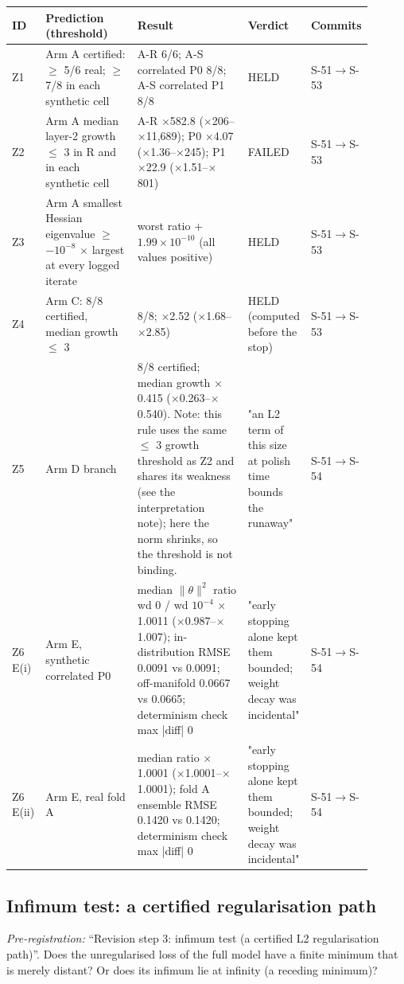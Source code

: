 {\footnotesize\setlength{\tabcolsep}{3pt}
\begin{longtable}{R{0.07\linewidth} R{0.28\linewidth} R{0.35\linewidth} R{0.09\linewidth} R{0.11\linewidth}}
\toprule
ID & Prediction (threshold) & Result & Verdict & Commits \\
\midrule
\endhead
Z1 & Arm A certified: $\geq$ 5/6 real; $\geq$ 7/8 in each synthetic cell & A-R 6/6; A-S correlated P0 8/8; A-S correlated P1 8/8 & HELD & S-51$\to$\allowbreak S-53 \\
Z2 & Arm A median layer-2 growth $\leq$ 3 in R and in each synthetic cell & A-R $\times$582.8 ($\times$206--$\times$11,689); P0 $\times$4.07 ($\times$1.36--$\times$245); P1 $\times$22.9 ($\times$1.51--$\times$801) & FAILED & S-51$\to$\allowbreak S-53 \\
Z3 & Arm A smallest Hessian eigenvalue $\geq$ $-10^{-8}$ $\times$ largest at every logged iterate & worst ratio +$1.99\times10^{-10}$ (all values positive) & HELD & S-51$\to$\allowbreak S-53 \\
Z4 & Arm C: 8/8 certified, median growth $\leq$ 3 & 8/8; $\times$2.52 ($\times$1.68--$\times$2.85) & HELD (computed before the stop) & S-51$\to$\allowbreak S-53 \\
Z5 & Arm D branch & 8/8 certified; median growth $\times$0.415 ($\times$0.263--$\times$0.540). Note: this rule uses the same $\leq$ 3 growth threshold as Z2 and shares its weakness (see the interpretation note); here the norm shrinks, so the threshold is not binding. & "an L2 term of this size at polish time bounds the runaway" & S-51$\to$\allowbreak S-54 \\
Z6 E(i) & Arm E, synthetic correlated P0 & median $\|\theta\|^{2}$ ratio wd 0 / wd $10^{-4}$ $\times$1.0011 ($\times$0.987--$\times$1.007); in-distribution RMSE 0.0091 vs 0.0091; off-manifold 0.0667 vs 0.0665; determinism check max |diff| 0 & "early stopping alone kept them bounded; weight decay was incidental" & S-51$\to$\allowbreak S-54 \\
Z6 E(ii) & Arm E, real fold A & median ratio $\times$1.0001 ($\times$1.0001--$\times$1.0001); fold A ensemble RMSE 0.1420 vs 0.1420; determinism check max |diff| 0 & "early stopping alone kept them bounded; weight decay was incidental" & S-51$\to$\allowbreak S-54 \\
\bottomrule
\end{longtable}}
\subsection{Infimum test: a certified regularisation path}
\noindent\textit{Pre-registration:} ``Revision step 3: infimum test (a certified L2 regularisation path)''. Does the unregularised loss of the full model have a finite minimum that is merely distant? Or does its infimum lie at infinity (a receding minimum)?

